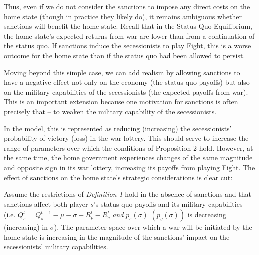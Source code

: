 Thus, even if we do not consider the sanctions to impose any direct costs on the home state (though in practice they likely do), it remains ambiguous whether sanctions will benefit the home state. Recall that in the Status Quo Equilibrium, the home state's expected returns from war are lower than from a continuation of the status quo. If sanctions induce the secessionists to play Fight, this is a worse outcome for the home state than if the status quo had been allowed to persist.  


Moving beyond this simple case, we can add realism by allowing sanctions to have a negative effect not only on the economy (the status quo payoffs) but also on the military capabilities of the secessionists (the expected payoffs from war). This is an important extension because one motivation for sanctions is often precisely that -- to weaken the military capability of the secessionists. 

In the model, this is represented as reducing (increasing) the secessionists' probability of victory (loss) in the war lottery. This should serve to increase the range of parameters over which the conditions of Proposition 2 hold. However, at the same time, the home government experiences changes of the same magnitude and opposite sign in its war lottery, increasing its payoffs from playing Fight. The effect of sanctions on the home state's strategic considerations is clear cut:

\begin{proposition}
Assume the restrictions of \emph{Definition 1} hold in the absence of sanctions and that sanctions affect both player $s$'s status quo payoffs and its military capabilities (i.e. $Q_s^t = Q_s^{t-1} - \mu -\sigma +R_p^t - R_c^t$ \emph{and} $p_s\left(\sigma\right)$ $\left(p_g\left(\sigma\right)\right)$ is decreasing (increasing) in $\sigma$). The parameter space over which a war will be initiated by the home state is increasing in the magnitude of the sanctions' impact on the secessionists' military capabilities.
\end{proposition}

